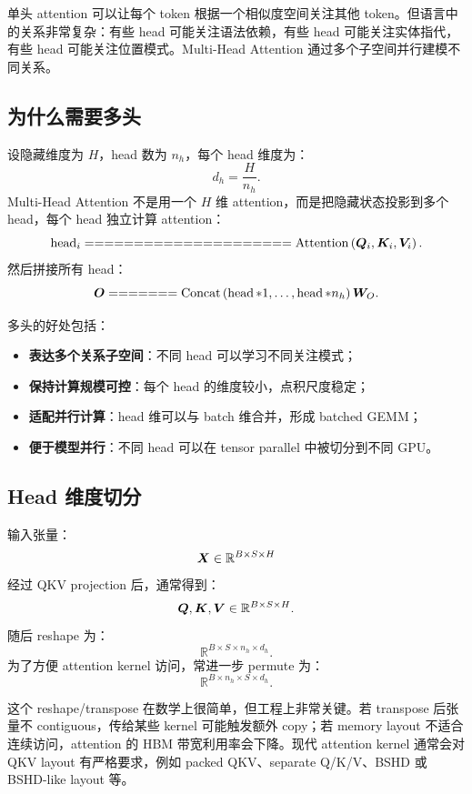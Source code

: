 单头 attention 可以让每个 token 根据一个相似度空间关注其他 token。但语言中的关系非常复杂：有些 head 可能关注语法依赖，有些 head 可能关注实体指代，有些 head 可能关注位置模式。Multi-Head Attention 通过多个子空间并行建模不同关系。

\subsection{为什么需要多头}
\label{subsec:why-multi-head}

设隐藏维度为 $H$，head 数为 $n_h$，每个 head 维度为：
\[
d_h=\frac{H}{n_h}.
\]
Multi-Head Attention 不是用一个 $H$ 维 attention，而是把隐藏状态投影到多个 head，每个 head 独立计算 attention：
\[
\operatorname{head}_i
=====================

\Attention
\left(
\mat{Q}_i,\mat{K}_i,\mat{V}_i
\right).
\]
然后拼接所有 head：
\[
\mat{O}
=======

\operatorname{Concat}
\left(
\operatorname{head}*1,\ldots,\operatorname{head}*{n_h}
\right)
\mat{W}_O.
\]

多头的好处包括：

\begin{itemize}
\item \textbf{表达多个关系子空间}：不同 head 可以学习不同关注模式；
\item \textbf{保持计算规模可控}：每个 head 的维度较小，点积尺度稳定；
\item \textbf{适配并行计算}：head 维可以与 batch 维合并，形成 batched GEMM；
\item \textbf{便于模型并行}：不同 head 可以在 tensor parallel 中被切分到不同 GPU。
\end{itemize}

\subsection{Head 维度切分}
\label{subsec:head-dimension-split}

输入张量：
\[
\bm{X}\in\mathbb{R}^{B\times S\times H}
\]
经过 QKV projection 后，通常得到：
\[
\bm{Q},\bm{K},\bm{V}\in\mathbb{R}^{B\times S\times H}.
\]
随后 reshape 为：
\[
\mathbb{R}^{B\times S\times n_h\times d_h}.
\]
为了方便 attention kernel 访问，常进一步 permute 为：
\[
\mathbb{R}^{B\times n_h\times S\times d_h}.
\]

这个 reshape/transpose 在数学上很简单，但工程上非常关键。若 transpose 后张量不 contiguous，传给某些 kernel 可能触发额外 copy；若 memory layout 不适合连续访问，attention 的 HBM 带宽利用率会下降。现代 attention kernel 通常会对 QKV layout 有严格要求，例如 packed QKV、separate Q/K/V、BSHD 或 BSHD-like layout 等。


